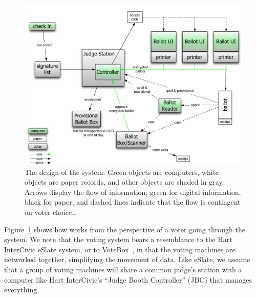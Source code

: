 ﻿\label{sec:voterflow}

\begin{figure}
\includegraphics[width=6.5in]{TravisVote.pdf}
\caption{The design of the \projname system. Green objects are computers, white objects are paper records, and other objects are shaded in gray. Arrows display the flow of information; green for digital information, black for paper, and dashed lines indicate that the flow is contingent on voter choice.\label{fig:design}.}
\end{figure}

Figure~\ref{fig:design} shows how \projname works from the perspective
of a voter going through the system. We note that the \projname voting system bears a resemblance to the Hart InterCivic eSlate system, or to VoteBox~\cite{sandler08votebox}, in that the voting machines are networked together, simplifying the movement of data. Like eSlate, we assume that a group of voting machines will share a common judge's station with a computer like Hart InterCivic's ``Judge Booth Controller'' (JBC) that manages everything. 

